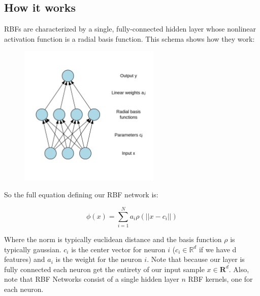 \documentclass[12pt]{article}
\begin{document}
\subsection{How it works}
RBFs are characterized by a single, fully-connected hidden layer whose nonlinear activation function is a radial basis function. This schema shows how they work:

\begin{figure}[H]
    \centering
    \includegraphics[width=0.6\textwidth]{./RBF.png} %
\end{figure}
So the full equation defining our RBF network is:

\[\phi(x) = \sum_{i=1}^N a_i \rho(||x - c_i||)\]

Where the norm is typically euclidean distance and the basis function \(\rho\) is typically gaussian. \(c_i\) is the center vector for neuron \(i\) (\(c_i \in \mathbb{R}^d\) if we have d features) and \(a_i\) is the weight for the neuron \(i\). Note that because our layer is fully connected each neuron get the entirety of our input sample \(x \in \mathbf{R}^d\). Also, note that RBF Networks consist of a single hidden layer \(n\) RBF kernels, one for each neuron.
\end{document}
